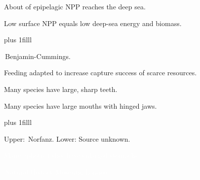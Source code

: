 \documentclass[t,handout]{beamer}  %
\begin{document}



{
\begin{frame}[t]{About  of epipelagic NPP reaches the deep sea.}

\vspace*{63mm}

\hangpara Low surface NPP equals low deep-sea energy and biomass.

\vskip0pt plus 1filll

\hfill\tiny\textcopyright\,Benjamin-Cummings.
\end{frame}}


{
\begin{frame}[t]{Feeding adapted to increase capture success of scarce resources.}

\hangpara\parbox{0.45\textwidth}{Many species have large, sharp teeth.}

\hangpara\parbox{0.45\textwidth}{Many species have large mouths with hinged jaws.}

\vskip0pt plus 1filll

\tiny Upper: \textcopyright\,Norfanz. Lower: Source unknown.
\end{frame}}


{
\begin{frame}[b]{\textcolor{white}{Many aphotic fishes have enlarged stomachs.}}

\tiny\textcolor{white}{\textcopyright\,Natural History Museum, London.}
\end{frame}}

{
\begin{frame}[b]
\end{frame}}
\end{document}
